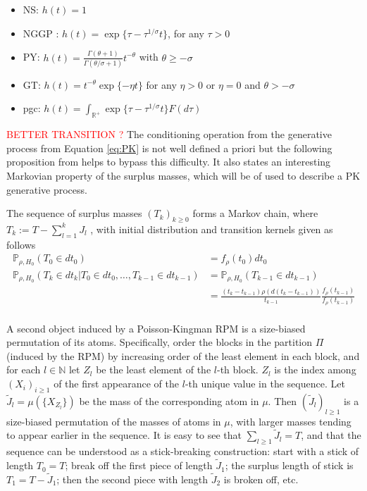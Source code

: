\begin{itemize}
\item \acrfull{NS}: $h(t) = 1$
\item \acrfull{NGGP} : $h(t) = \exp\{\tau - \tau^{1/\sigma}t \}$, for any $\tau > 0$
\item \acrfull{PY}: $h(t) = \frac{\Gamma(\theta + 1)}{\Gamma(\theta / \sigma + 1)}t^{-\theta}$ with $\theta \ge -\sigma$
\item \acrfull{GT}: $h(t) = t^{-\theta} \exp\{-\eta t\}$ for any $\eta > 0$ or $\eta=0$ and $\theta>-\sigma$
\item \acrfull{pgc}: $h(t) = \int_{\mathbb{R}^+} \exp\{\tau - \tau^{1/\sigma}t \} F(d\tau)$ \\
\end{itemize}

\textcolor{red}{BETTER TRANSITION ?}
The conditioning operation from the generative process from Equation \ref{eq:PK} is not well defined a priori but the following proposition from \cite{Perman:1992ke} helps to bypass this difficulty. It also states an interesting Markovian property of the surplus masses, which will be of used to describe a \gls{PK} generative process. \\

\begin{proposition} \label{prop:perman}
The sequence of surplus masses $\left(T_k \right)_{k \ge 0}$ forms a Markov chain, where $T_k := T - \sum_{l=1}^k J_l$ , with initial distribution and transition kernels given as follows
\begin{equation*}
\begin{aligned}
\mathbb{P}_{\rho,H_0}(T_0 \in dt_0) &= f_\rho(t_0)dt_0 \\
\mathbb{P}_{\rho,H_0}(T_k \in dt_k|T_0 \in dt_0,\dots, T_{k-1} \in dt_{k-1}) &=  \mathbb{P}_{\rho,H_0}(T_{k-1} \in dt_{k-1})\\
&= \frac{(t_k-t_{k-1})\rho(d(t_k-t_{k-1}))}{t_{k-1}} \frac{f_\rho(t_{k-1})}{f_\rho(t_{k-1})} \\
\end{aligned}
\end{equation*}
\end{proposition}


A second object induced by a Poisson-Kingman \gls{RPM} is a size-biased permutation of its atoms. Specifically, order the blocks in the partition $\Pi$ (induced by the \gls{RPM}) by increasing order of the least element in each block, and for each $l \in \mathbb{N}$ let $Z_l$ be the least element of the $l$-th block. $Z_l$ is the index among $(X_i)_{i \ge 1}$ of the first appearance of the $l$-th unique value in the sequence.
Let $\tilde{J}_l = \mu(\{X_{Z_l}\})$ be the mass of the corresponding atom in $\mu$. Then $(\tilde{J}_l)_{l\ge 1}$ is a size-biased permutation of the masses of atoms in $\mu$, with larger masses tending to appear earlier in the sequence. It is easy to see that $\sum_{l \ge 1}{\tilde{J}_l} = T$, and that the sequence can be understood as a stick-breaking construction: start with a stick of length $T_0 = T$; break off the first piece of length $\tilde{J}_1$; the surplus length of stick is $T_1 = T - \tilde{J}_1$; then
the second piece with length $\tilde{J}_2$ is broken off, etc.

